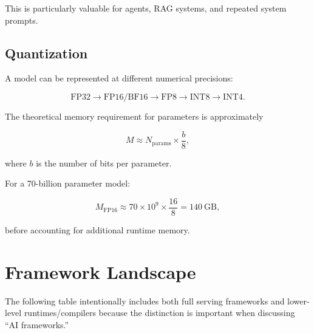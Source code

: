 \documentclass[11pt,a4paper]{article}
\begin{document}
This is particularly valuable for agents, RAG systems, and repeated
system prompts.

\subsection{Quantization}

A model can be represented at different numerical precisions:

\[
\mathrm{FP32}
\rightarrow
\mathrm{FP16/BF16}
\rightarrow
\mathrm{FP8}
\rightarrow
\mathrm{INT8}
\rightarrow
\mathrm{INT4}.
\]

The theoretical memory requirement for parameters is approximately

\[
M
\approx
N_{\mathrm{params}}
\times
\frac{b}{8},
\]

where $b$ is the number of bits per parameter.

For a 70-billion parameter model:

\[
M_{\mathrm{FP16}}
\approx
70\times10^9
\times
\frac{16}{8}
=
140\ \mathrm{GB},
\]

before accounting for additional runtime memory.

\section{Framework Landscape}

The following table intentionally includes both full serving
frameworks and lower-level runtimes/compilers because the distinction
is important when discussing ``AI frameworks.''
\end{document}
